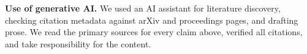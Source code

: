 \documentclass[10pt]{article}
\begin{document}
\otherrefs

\vspace{2pt}
{\footnotesize\textbf{Use of generative AI.} We used an AI assistant for literature discovery,
checking citation metadata against arXiv and proceedings pages, and drafting prose. We read the
primary sources for every claim above, verified all citations, and take responsibility for the
content.}
\end{document}
